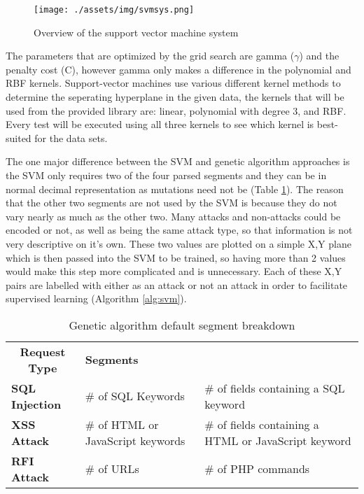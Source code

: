 \begin{figure}
	\texttt{[image: ./assets/img/svmsys.png]}
	\caption{Overview of the support vector machine system}
	\label{fig:svmsys}
\end{figure}

The parameters that are optimized by the grid search are gamma ($\gamma$) and the penalty cost (C), however gamma only makes a difference in the polynomial and RBF kernels.  Support-vector machines use various different kernel methods to determine the seperating hyperplane in the given data, the kernels that will be used from the provided library are: linear, polynomial with degree 3, and RBF.  Every test will be executed using all three kernels to see which kernel is best-suited for the data sets.  

The one major difference between the SVM and genetic algorithm approaches is the SVM only requires two of the four parsed segments and they can be in normal decimal representation as mutations need not be (Table \ref{tab:svmSegments}).  The reason that the other two segments are not used by the SVM is because they do not vary nearly as much as the other two.  Many attacks and non-attacks could be encoded or not, as well as being the same attack type, so that information is not very descriptive on it's own.  These two values are plotted on a simple X,Y plane which is then passed into the SVM to be trained, so having more than 2 values would make this step more complicated and is unnecessary.  Each of these X,Y pairs are labelled with either as an attack or not an attack in order to facilitate supervised learning (Algorithm \ref{alg:svm}).

\begin{table}
	\begin{tabular}{|p{1.5in}|p{2in}|p{2in}|}
	\hline
	\multicolumn{1}{|c|}{\textbf{Request Type}} & \multicolumn{2}{p{4in}|}{\textbf{Segments}}               \\ \hhline{|=|=|=|}
	\textbf{SQL Injection}                      & \# of SQL Keywords         & \# of fields containing a SQL keyword \\ \hline
	\textbf{XSS Attack}                      & \# of HTML or JavaScript keywords         & \# of fields containing a HTML or JavaScript keyword \\ \hline
	\textbf{RFI Attack}                      & \# of URLs         & \# of PHP commands \\ \hline
	\end{tabular}
	\caption{Genetic algorithm default segment breakdown}
	\label{tab:svmSegments}
\end{table}

